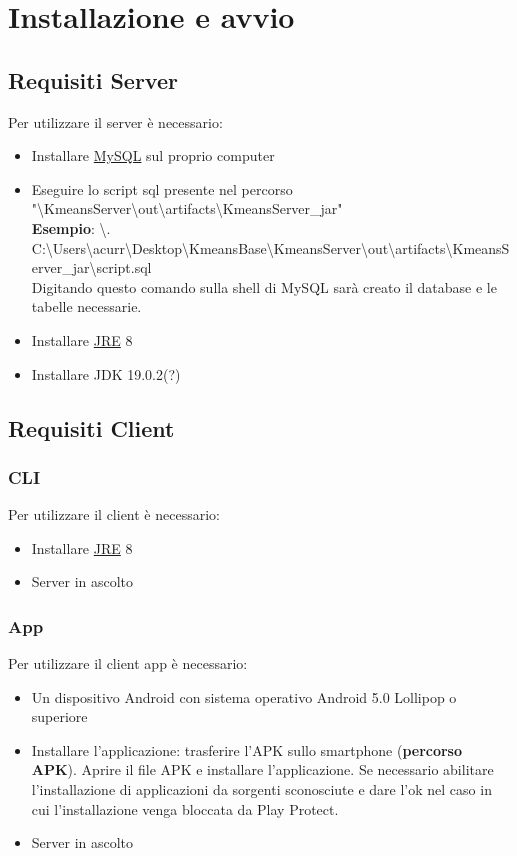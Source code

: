 \section{Installazione e avvio}
\subsection{Requisiti Server}
\noindent Per utilizzare il server è necessario:
\begin{itemize}[label=-]
  \item Installare \href{https://dev.mysql.com/downloads/installer/}{MySQL} sul proprio computer
  \item Eseguire lo script sql presente nel percorso "\textbackslash KmeansServer\textbackslash out\textbackslash artifacts\textbackslash KmeansServer\_jar"
  \\ \textbf{Esempio}: \textbackslash . C:\textbackslash Users\textbackslash acurr\textbackslash Desktop\textbackslash KmeansBase\textbackslash KmeansServer\textbackslash out\textbackslash artifacts\textbackslash KmeansServer\_jar\textbackslash script.sql
  \\ Digitando questo comando sulla shell di MySQL sarà creato il database e le tabelle necessarie.
  \item Installare \href{https://www.oracle.com/technetwork/java/javase/downloads/jre8-downloads-2133155.html}{JRE} 8
  \item Installare JDK 19.0.2(?)
\end{itemize}

\subsection{Requisiti Client}
\subsubsection{CLI}
\noindent Per utilizzare il client è necessario:
\begin{itemize}[label=-]
  \item Installare \href{https://www.oracle.com/technetwork/java/javase/downloads/jre8-downloads-2133155.html}{JRE} 8  
  \item Server in ascolto
\end{itemize}

\subsubsection{App}
\noindent Per utilizzare il client app è necessario:
\begin{itemize}[label=-]
  \item Un dispositivo Android con sistema operativo Android 5.0 Lollipop o superiore
  \item Installare l'applicazione: trasferire l'APK sullo smartphone (\textbf{percorso APK}). Aprire il file APK e installare l'applicazione. Se necessario abilitare l'installazione di applicazioni da sorgenti sconosciute e dare l'ok nel caso in cui l'installazione venga bloccata da Play Protect.
  \item Server in ascolto
\end{itemize}


